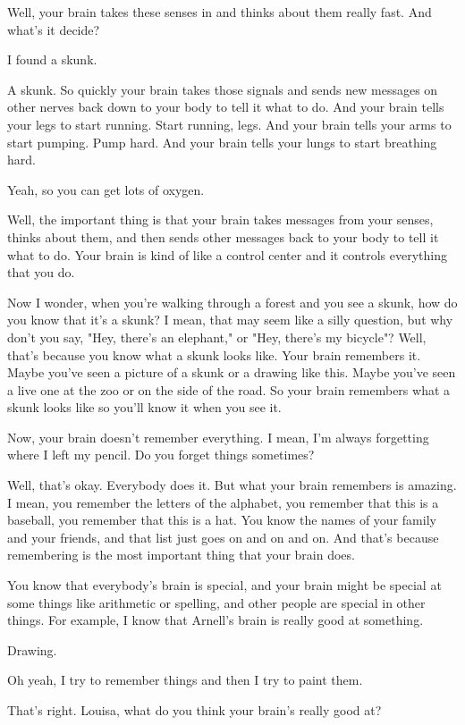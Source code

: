 Well, your brain takes these senses in and thinks about them really fast. And what's it decide?

I found a skunk.

A skunk. So quickly your brain takes those signals and sends new messages on other nerves back down to your body to tell it what to do. And your brain tells your legs to start running. Start running, legs. And your brain tells your arms to start pumping. Pump hard. And your brain tells your lungs to start breathing hard.

Yeah, so you can get lots of oxygen.

Well, the important thing is that your brain takes messages from your senses, thinks about them, and then sends other messages back to your body to tell it what to do. Your brain is kind of like a control center and it controls everything that you do.

Now I wonder, when you're walking through a forest and you see a skunk, how do you know that it's a skunk? I mean, that may seem like a silly question, but why don't you say, "Hey, there's an elephant," or "Hey, there's my bicycle"? Well, that's because you know what a skunk looks like. Your brain remembers it. Maybe you've seen a picture of a skunk or a drawing like this. Maybe you've seen a live one at the zoo or on the side of the road. So your brain remembers what a skunk looks like so you'll know it when you see it.

Now, your brain doesn't remember everything. I mean, I'm always forgetting where I left my pencil. Do you forget things sometimes?

Well, that's okay. Everybody does it. But what your brain remembers is amazing. I mean, you remember the letters of the alphabet, you remember that this is a baseball, you remember that this is a hat. You know the names of your family and your friends, and that list just goes on and on and on. And that's because remembering is the most important thing that your brain does.

You know that everybody's brain is special, and your brain might be special at some things like arithmetic or spelling, and other people are special in other things. For example, I know that Arnell's brain is really good at something.

Drawing.

Oh yeah, I try to remember things and then I try to paint them.

That's right. Louisa, what do you think your brain's really good at?

